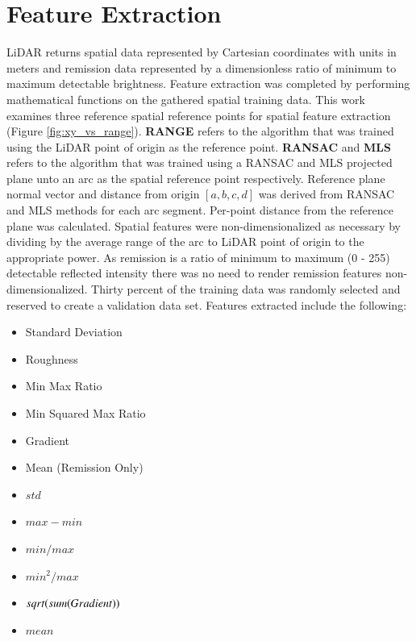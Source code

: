 \documentclass[numbered,pdftex]{ohio-etd}
\begin{document}
{{	} %
	
	\section{Feature Extraction}\label{sec:Feat_Extract} {
	
		{LiDAR returns spatial data represented by Cartesian coordinates with units in meters and remission data represented by a dimensionless ratio of minimum to maximum detectable brightness. Feature extraction was completed by performing mathematical functions on the gathered spatial training data. This work examines three reference spatial reference points for spatial feature extraction (Figure \ref{fig:xy_vs_range}). \textbf{RANGE} refers to the algorithm that was trained using the LiDAR point of origin as the reference point. \textbf{RANSAC} and \textbf{MLS} refers to the algorithm that was trained using a RANSAC and MLS projected plane unto an arc as the spatial reference point respectively. Reference plane normal vector and distance from origin $[a,b,c,d]$ was derived from RANSAC and MLS methods for each arc segment. Per-point distance from the reference plane was calculated. Spatial features were non-dimensionalized as necessary by dividing by the average range of the arc to LiDAR point of origin to the appropriate power. As remission is a ratio of minimum to maximum (0 - 255) detectable reflected intensity there was no need to render remission features non-dimensionalized. Thirty percent of the training data was randomly selected and reserved to create a validation data set. Features extracted include the following:}
		
		\begin{multicols}{2}
			\begin{itemize}[itemsep=.1pt]
				\item Standard Deviation
				\item Roughness
				\item Min Max Ratio
				\item Min Squared Max Ratio
				\item Gradient
				\item Mean (Remission Only)
			\end{itemize}
			\vfill\null
			\columnbreak
			\begin{itemize}[itemsep=.1pt]
				\item $std$
				\item $max - min$
				\item $min / max$
				\item $min^2 / max$
				\item $sqrt(sum(Gradient\*))$
				\item $mean$
			\end{itemize}
			\vfill\null
			\label{lst:feature_list}
		\end{multicols}
		
}}
\end{document}
